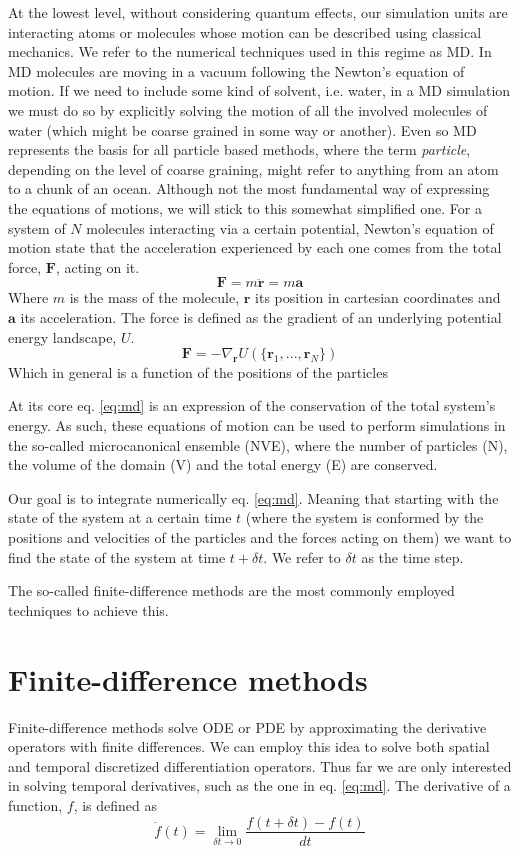 \documentclass[ twoside,openright,titlepage,numbers=noenddot,%
headinclude,footinclude,cleardoublepage=empty,abstract=on,
BCOR=5mm,paper=a4,fontsize=11pt, dvipsnames
]{scrreprt}
\renewcommand{\vec}[1]{\bm{#1}}
\newcommand{\dt}{\delta t}
\begin{document}
At the lowest level, without considering quantum effects, our simulation units are interacting atoms or molecules whose motion can be described using classical mechanics. We refer to the numerical techniques used in this regime as \gls{MD}.
In \gls{MD} molecules are moving in a vacuum following the Newton's equation of motion. If we need to include some kind of solvent, i.e. water, in a \gls{MD} simulation we must do so by explicitly solving the motion of all the involved molecules of water (which might be coarse grained in some way or another).
Even so \gls{MD} represents the basis for all particle based methods, where the term \emph{particle}, depending on the level of coarse graining, might refer to anything from an atom to a chunk of an ocean.
Although not the most fundamental way of expressing the equations of motions, we will stick to this somewhat simplified one. For a system of $N$ molecules interacting via a certain potential, Newton's equation of motion state that the acceleration experienced by each one comes from the total force, $\vec{F}$, acting on it.
\begin{equation}
  \label{eq:md}
  \vec{F} =  m\ddot{\vec{r}} = m\vec{a}
\end{equation}
Where $m$ is the mass of the molecule, $\vec{r}$ its position in cartesian coordinates and $\vec{a}$ its acceleration.
The force is defined as the gradient of an underlying potential energy landscape, $U$.
\begin{equation}
  \label{eq:mdfv}
  \vec{F} = -\nabla_{\vec{r}} U(\{\vec{r}_1,...,\vec{r}_N\})
\end{equation}
Which in general is a function of the positions of the particles


At its core eq. \eqref{eq:md} is an expression of the conservation of the total system's energy. As such, these equations of motion can be used to perform simulations in the so-called microcanonical ensemble (NVE), where the number of particles (N), the volume of the domain (V) and the total energy (E) are conserved.


Our goal is to integrate numerically eq. \eqref{eq:md}. Meaning that starting with the state of the system at a certain time $t$ (where the system is conformed by the positions and velocities of the particles and the forces acting on them) we want to find the state of the system at time $t + \dt$. We refer to $\dt$ as the time step.

The so-called finite-difference methods are the most commonly employed techniques to achieve this.
\section{Finite-difference methods}
Finite-difference methods\cite{fdm} solve \gls{ODE} or \gls{PDE} by approximating the derivative operators with finite differences.
We can employ this idea to solve both spatial and temporal discretized differentiation operators. Thus far we are only interested in solving temporal derivatives, such as the one in eq. \eqref{eq:md}.
The derivative of a function, $f$, is defined as
\begin{equation}
  \dot{f}(t) = \lim_{\dt\rightarrow 0} \frac{f(t+\dt) - f(t)}{dt}
\end{equation}
\end{document}
